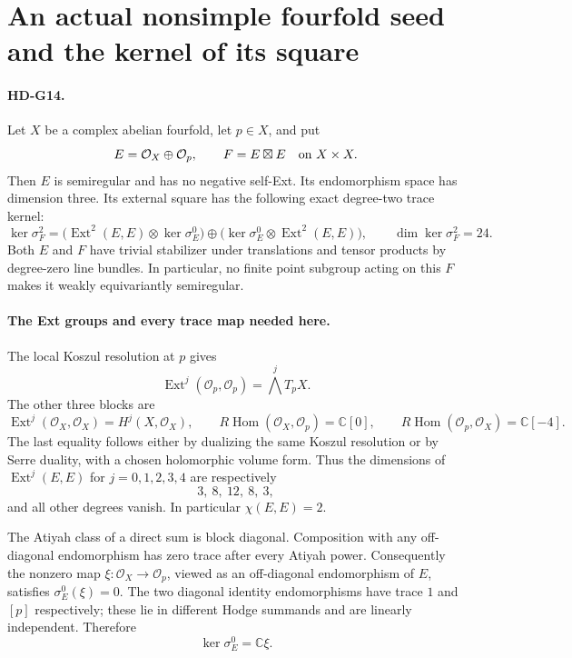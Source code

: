 \section{An actual nonsimple fourfold seed and the kernel of its square}

\paragraph{HD-G14.}
Let $X$ be a complex abelian fourfold, let $p\in X$, and put
\[
 E=\mathcal O_X\oplus\mathcal O_p,\qquad
 F=E\boxtimes E\quad\hbox{on }X\times X.
\]
Then $E$ is semiregular and has no negative self-Ext.
Its endomorphism space has dimension three.
Its external square has the following exact degree-two trace kernel:
\[
 \ker\sigma_F^2=
 \bigl(\operatorname{Ext}^2(E,E)\otimes\ker\sigma_E^0\bigr)
 \oplus
 \bigl(\ker\sigma_E^0\otimes\operatorname{Ext}^2(E,E)\bigr),
 \qquad \dim\ker\sigma_F^2=24.                         \tag{G14.1}
\]
Both $E$ and $F$ have trivial stabilizer under translations and
tensor products by degree-zero line bundles. In particular,
no finite point subgroup acting on this $F$ makes it weakly
equivariantly semiregular.

\paragraph{The Ext groups and every trace map needed here.}
The local Koszul resolution at $p$ gives
\[
 \operatorname{Ext}^j(\mathcal O_p,\mathcal O_p)
       =\bigwedge^jT_pX.
\]
The other three blocks are
\[
 \operatorname{Ext}^j(\mathcal O_X,\mathcal O_X)
       =H^j(X,\mathcal O_X),\qquad
 R\operatorname{Hom}(\mathcal O_X,\mathcal O_p)=\mathbb C[0],
 \qquad
 R\operatorname{Hom}(\mathcal O_p,\mathcal O_X)=\mathbb C[-4].
                                                               \tag{G14.2}
\]
The last equality follows either by dualizing the same Koszul
resolution or by Serre duality, with a chosen holomorphic volume
form. Thus the dimensions of $\operatorname{Ext}^j(E,E)$ for
$j=0,1,2,3,4$ are respectively
\[
                 3,\ 8,\ 12,\ 8,\ 3,                       \tag{G14.3}
\]
and all other degrees vanish. In particular $\chi(E,E)=2$.

The Atiyah class of a direct sum is block diagonal. Composition
with any off-diagonal endomorphism has zero trace after every
Atiyah power. Consequently the nonzero map
$\xi:\mathcal O_X\to\mathcal O_p$, viewed as an off-diagonal
endomorphism of $E$, satisfies $\sigma_E^0(\xi)=0$.
The two diagonal identity endomorphisms have trace
$1$ and $[p]$ respectively; these lie in different Hodge
summands and are linearly independent. Therefore
\[
                    \ker\sigma_E^0=\mathbb C\xi.          \tag{G14.4}
\]

